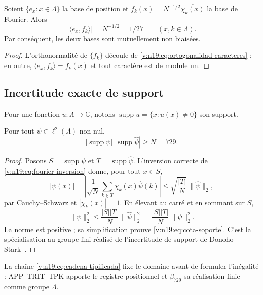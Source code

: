 \begin{lemma}
\label{v:n19:lem:mub}
Soient \(\{e_x:x\in\Lambda\}\) la base de position et
\(f_k(x)=N^{-1/2}\overline{\chi_k(x)}\) la base de Fourier. Alors
\begin{equation}
 |\langle e_x,f_k\rangle|=N^{-1/2}=1/27
 \qquad(x,k\in\Lambda).
 \label{v:n19:eq:mub}
\end{equation}
Par conséquent, les deux bases sont mutuellement non biaisées.
\end{lemma}
\begin{proof}
L’orthonormalité de \(\{f_k\}\) découle de
\eqref{v:n19:eq:ortogonalidad-caracteres} ; en outre,
\(\langle e_x,f_k\rangle=f_k(x)\) et tout caractère est de module un.
\end{proof}

\subsection{Incertitude exacte de support}
\label{v:n19:sec:soporte}

Pour une fonction \(u:\Lambda\to\mathbb C\), notons
\(\operatorname{supp}u=\{x:u(x)\ne0\}\) son support.

\begin{theorem}
\label{v:n19:thm:soporte}
Pour tout \(\psi\in\ell^2(\Lambda)\) non nul,
\begin{equation}
 |\operatorname{supp}\psi|\,
 |\operatorname{supp}\widehat\psi|\ge N=729.
 \label{v:n19:eq:cota-soporte}
\end{equation}
\end{theorem}
\begin{proof}
Posons \(S=\operatorname{supp}\psi\) et
\(T=\operatorname{supp}\widehat\psi\). L’inversion correcte de
\eqref{v:n19:eq:fourier-inversion} donne, pour tout \(x\in S\),
\[
 |\psi(x)|
 =\left|\frac1{\sqrt N}\sum_{k\in T}
       \overline{\chi_k(x)}\widehat\psi(k)\right|
 \le \sqrt{\frac{|T|}{N}}\,\|\widehat\psi\|_2,
\]
par Cauchy--Schwarz et \(|\chi_k(x)|=1\). En élevant au carré et
en sommant sur \(S\),
\[
 \|\psi\|_2^2
 \le\frac{|S||T|}{N}\,\|\widehat\psi\|_2^2
 =\frac{|S||T|}{N}\,\|\psi\|_2^2.
\]
La norme est positive ; sa simplification prouve
\eqref{v:n19:eq:cota-soporte}. C’est la spécialisation au groupe
fini réalisé de l’incertitude de support de
Donoho--Stark~\cite{donoho_stark_1989}.
\end{proof}

La chaîne \eqref{v:n19:eq:cadena-tipificada} fixe le domaine avant de
formuler l’inégalité : APP--TRIT--TPK apporte le registre positionnel et
\(\beta_{729}\) sa réalisation finie comme groupe \(\Lambda\).

